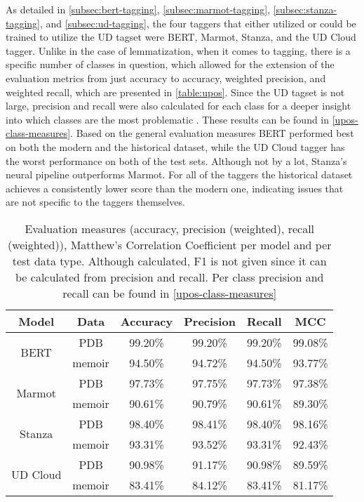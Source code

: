 As detailed in \autoref{subsec:bert-tagging}, \autoref{subsec:marmot-tagging}, \autoref{subsec:stanza-tagging}, and \autoref{subsec:ud-tagging}, the four taggers that either utilized or could be trained to utilize the UD tagset were BERT, Marmot, Stanza, and the UD Cloud tagger. Unlike in the case of lemmatization, when it comes to tagging, there is a specific number of classes in question, which allowed for the extension of the evaluation metrics from just accuracy to accuracy, weighted precision, and weighted recall, which are presented in \autoref{table:upos}. Since the UD tagset is not large, precision and recall were also calculated for each class for a deeper insight into which classes are the most problematic \citep{ud-tagset}. These results can be found in \autoref{upos-class-measures}. Based on the general evaluation measures BERT performed best on both the modern and the historical dataset, while the UD Cloud tagger has the worst performance on both of the test sets. Although not by a lot, Stanza's neural pipeline outperforms Marmot. For all of the taggers the historical dataset achieves a consistently lower score than the modern one, indicating issues that are not specific to the taggers themselves. 

\renewcommand{\arraystretch}{1.25}
\begin{table}[H]
\begin{center}
\begin{tabular}{|cc|cccc|}
\hline \bf Model & \bf Data & \bf Accuracy & \bf Precision & \bf Recall & \bf MCC \\ \hline
\multirow{2}{4em}{BERT}
& PDB & 99.20\% & 99.20\% & 99.20\% & 99.08\% \\
& memoir & 94.50\% & 94.72\% & 94.50\% & 93.77\%  \\
\multirow{2}{4em}{Marmot}
& PDB & 97.73\% & 97.75\% & 97.73\% & 97.38\% \\
& memoir & 90.61\% & 90.79\% & 90.61\% & 89.30\% \\
\multirow{2}{4em}{Stanza}
& PDB & 98.40\% & 98.41\% & 98.40\% & 98.16\% \\
& memoir & 93.31\% & 93.52\% & 93.31\% & 92.43\% \\
\multirow{2}{4em}{UD Cloud}
& PDB & 90.98\% & 91.17\% & 90.98\% & 89.59\% \\
& memoir & 83.41\% & 84.12\% & 83.41\% & 81.17\% \\ 
\hline
\end{tabular}
\caption{\label{table:upos} Evaluation measures (accuracy, precision (weighted), recall (weighted)), Matthew's Correlation Coefficient per model and per test data type. Although calculated, F1 is not given since it can be calculated from precision and recall. Per class precision and recall can be found in \autoref{upos-class-measures}}
\end{center}
\end{table}

